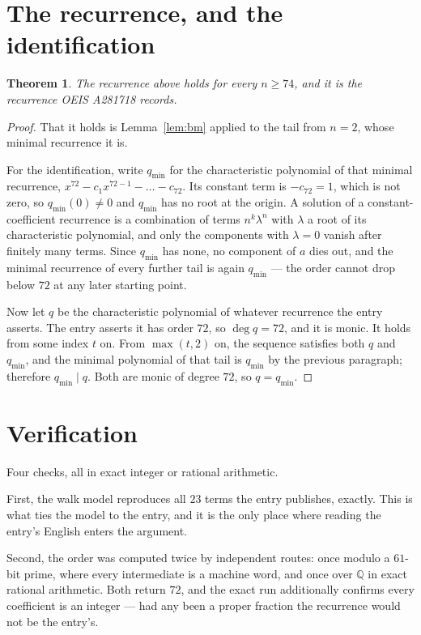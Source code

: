 \documentclass[11pt,a4paper]{article}
\theoremstyle{plain}
\newtheorem{theorem}{Theorem}
\theoremstyle{definition}
\begin{document}
\section{The recurrence, and the identification}

\begin{theorem}
The recurrence above holds for every $n\ge74$, and it is the recurrence OEIS A281718 records.
\end{theorem}

\begin{proof}
That it holds is Lemma~\ref{lem:bm} applied to the tail from $n=2$, whose minimal
recurrence it is.

For the identification, write $q_{\min}$ for the characteristic polynomial of that minimal
recurrence, $x^{72}-c_1x^{72-1}-\dots-c_{72}$. Its constant term is
$-c_{72}=1$, which is not zero, so $q_{\min}(0)\neq0$ and $q_{\min}$ has no
root at the origin. A solution of a constant-coefficient recurrence is a combination of terms
$n^{k}\lambda^{n}$ with $\lambda$ a root of its characteristic polynomial, and only the
components with $\lambda=0$ vanish after finitely many terms. Since $q_{\min}$ has none, no
component of $a$ dies out, and the minimal recurrence of every further tail is again
$q_{\min}$ --- the order cannot drop below $72$ at any later starting point.

Now let $q$ be the characteristic polynomial of whatever recurrence the entry asserts. The
entry asserts it has order $72$, so $\deg q=72$, and it is monic. It holds from some
index $t$ on. From $\max(t,2)$ on, the sequence satisfies both $q$ and $q_{\min}$, and
the minimal polynomial of that tail is $q_{\min}$ by the previous paragraph; therefore
$q_{\min}\mid q$. Both are monic of degree $72$, so $q=q_{\min}$.
\end{proof}

\section{Verification}

Four checks, all in exact integer or rational arithmetic.

First, the walk model reproduces all $23$ terms the entry publishes, exactly. This is
what ties the model to the entry, and it is the only place where reading the entry's English
enters the argument.

Second, the order was computed twice by independent routes: once modulo a $61$-bit prime, where
every intermediate is a machine word, and once over $\mathbb{Q}$ in exact rational arithmetic.
Both return $72$, and the exact run additionally confirms every coefficient is an integer
--- had any been a proper fraction the recurrence would not be the entry's.
\end{document}

